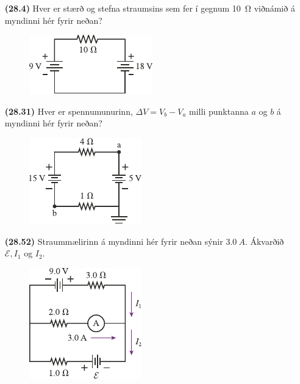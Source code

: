 \begin{enumerate}[label = \textbf{(\alph*)}]

\item[\textbf{(28.4)}] Hver er stærð og stefna straumsins sem fer í gegnum \SI{10}{\ohm} viðnámið á myndinni hér fyrir neðan?

\begin{figure}[H]
    \centering
    \includegraphics[scale = 1.2]{figures/rk284.pdf}
\end{figure}

\item[\textbf{(28.31)}] Hver er spennumunurinn, $\Delta V  = V_b - V_a$ milli punktanna $a$ og $b$ á myndinni hér fyrir neðan?

\begin{figure}[H]
    \centering
    \includegraphics[scale = 1.2]{figures/rk2831.pdf}
\end{figure}

\item[\textbf{(28.52)}] Straummælirinn á myndinni hér fyrir neðan sýnir $\SI{3.0}{A}$. Ákvarðið $\mathcal{E}, I_1$ og $I_2$. 

\begin{figure}[H]
    \centering
    \includegraphics[scale = 1.2]{figures/rk2852.pdf}
\end{figure}


\end{enumerate}
